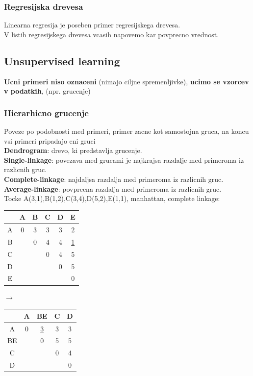 \subsubsection{Regresijska drevesa}
Linearna regresija je poseben primer regresijskega drevesa.\\
V listih regresijskega drevesa vcasih napovemo kar povprecno vrednost.

\subsection{Unsupervised learning}
\textbf{Ucni primeri niso oznaceni} (nimajo ciljne spremenljivke),
\textbf{ucimo se vzorcev v podatkih}, (npr. grucenje)

\subsubsection{Hierarhicno grucenje}
Poveze po podobnosti med primeri, primer zacne kot samostojna gruca, na koncu vsi primeri pripadajo eni gruci\\
\textbf{Dendrogram}: drevo, ki predstavlja grucenje.\\
\textbf{Single-linkage}: povezava med grucami je najkrajsa razdalje med primeroma iz razlicnih gruc.\\
\textbf{Complete-linkage}: najdaljsa razdalja med primeroma iz razlicnih gruc.\\
\textbf{Average-linkage}: povprecna razdalja med primeroma iz razlicnih gruc.\\
Tocke A(3,1),B(1,2),C(3,4),D(5,2),E(1,1), manhattan, complete linkage:\\
\begin{tabular}{c|ccccc}
    & A & B & C & D & E\\
    \hline
    A & 0 & 3 & 3 & 3 & 2\\
    B &   & 0 & 4 & 4 & \underline{1}\\
    C &   &   & 0 & 4 & 5\\
    D &   &   &   & 0 & 5\\
    E &   &   &   &   & 0\\
\end{tabular}
$\rightarrow$
\begin{tabular}{c|cccc}
    & A & BE & C & D\\
    \hline
    A & 0 & \underline{3} & 3 & 3\\
    BE &   & 0 & 5 & 5\\
    C &  &   & 0 & 4\\
    D &   &   &   & 0\\
\end{tabular}

